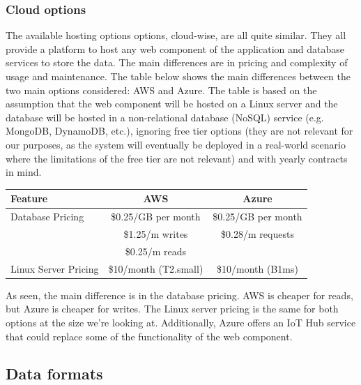 \subsubsection{Cloud options}
The available hosting options options, cloud-wise, are all quite similar. They all
provide a platform to host any web component of the application and database services
to store the data. The main differences are in pricing and complexity of usage and
maintenance. The table below shows the main differences between the two main
options considered: AWS and Azure. The table is based on the assumption
that the web component will be hosted on a Linux server and the database will be
hosted in a non-relational database (NoSQL) service (e.g. MongoDB, DynamoDB, etc.),
ignoring free tier options (they are not relevant for our purposes, as the system will
eventually be deployed in a real-world scenario where the limitations of the free
tier are not relevant) and with yearly contracts in mind.

\begin{table}[htbp]
    \centering
    \begin{tabularx}{\columnwidth}{|l|c|c|}
        \hline
        \textbf{Feature} & \textbf{AWS} & \textbf{Azure} \\
        \hline
        Database Pricing &
            \$0.25/GB per month & \$0.25/GB per month \\
         & \$1.25/m writes & \$0.28/m requests \\
         & \$0.25/m reads \\
        \hline
        Linux Server Pricing &
            \$10/month (T2.small) & 
            \$10/month (B1ms) \\
        \hline
        \end{tabularx}
\end{table}

As seen, the main difference is in the database pricing. AWS is cheaper for reads,
but Azure is cheaper for writes. The Linux server pricing is the same for both options
at the size we're looking at. Additionally, Azure offers an IoT Hub service that
could replace some of the functionality of the web component.
\subsection{Data formats}
